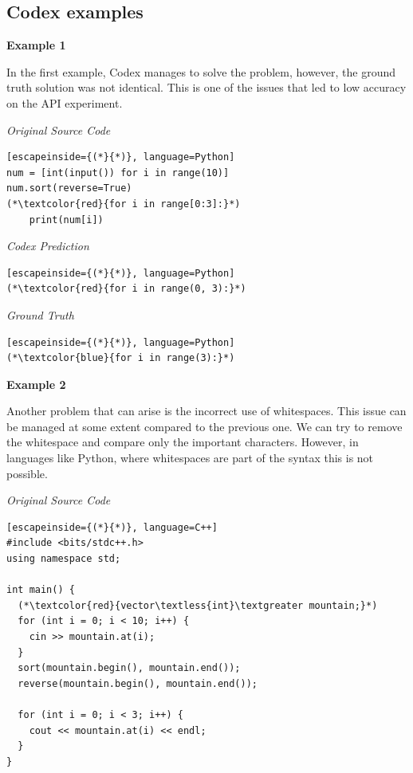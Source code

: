 \documentclass[12pt,a4paper]{report}
\begin{document}
\begin{appendices}
\chapter{Codex examples}

\textbf{Example 1}

In the first example, Codex manages to solve the problem, however, the ground truth solution was not identical. This is one of the issues that led to low accuracy on the API experiment.

\textit{Original Source Code}

\begin{lstlisting}[escapeinside={(*}{*)}, language=Python]
num = [int(input()) for i in range(10)]
num.sort(reverse=True)
(*\textcolor{red}{for i in range[0:3]:}*)
    print(num[i])
\end{lstlisting}

\textit{Codex Prediction}

\begin{lstlisting}[escapeinside={(*}{*)}, language=Python]
(*\textcolor{red}{for i in range(0, 3):}*)
\end{lstlisting}

\textit{Ground Truth}

\begin{lstlisting}[escapeinside={(*}{*)}, language=Python]
(*\textcolor{blue}{for i in range(3):}*)
\end{lstlisting}

\textbf{Example 2}

Another problem that can arise is the incorrect use of whitespaces. This issue can be managed at some extent compared to the previous one. We can try to remove the whitespace and compare only the important characters. However, in languages like Python, where whitespaces are part of the syntax this is not possible.

\textit{Original Source Code}

\begin{lstlisting}[escapeinside={(*}{*)}, language=C++]
#include <bits/stdc++.h> 
using namespace std; 
 
int main() { 
  (*\textcolor{red}{vector\textless{int}\textgreater mountain;}*)
  for (int i = 0; i < 10; i++) { 
    cin >> mountain.at(i); 
  } 
  sort(mountain.begin(), mountain.end()); 
  reverse(mountain.begin(), mountain.end()); 
 
  for (int i = 0; i < 3; i++) { 
    cout << mountain.at(i) << endl; 
  } 
}
\end{lstlisting}


\end{appendices}
\end{document}
